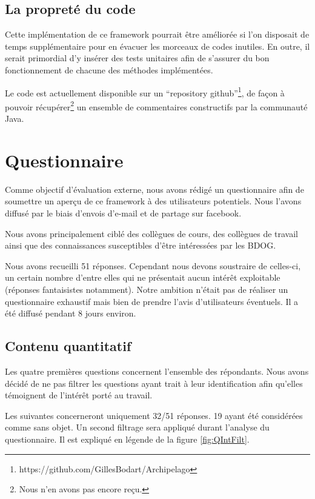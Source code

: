 \documentclass[a4paper,fleqn,12pt,oneside]{report}
\begin{document}
\subsection{La propreté du code}

Cette implémentation de ce framework pourrait être améliorée si l'on disposait de temps supplémentaire pour en évacuer les morceaux de codes inutiles. En outre, il serait primordial d'y insérer des tests unitaires afin de s'assurer du bon fonctionnement de chacune des méthodes implémentées.

Le code est actuellement disponible sur un \enquote{repository github}\footnote{https://github.com/GillesBodart/Archipelago}, de façon à pouvoir récupérer\footnote{Nous n'en avons pas encore reçu.} un ensemble de commentaires constructifs par la communauté Java. 

\section{Questionnaire}

Comme objectif d'évaluation externe, nous avons rédigé un questionnaire afin de soumettre un aperçu de ce framework à des utilisateurs potentiels. Nous l'avons diffusé par le biais d'envois d'e-mail et de partage sur facebook.

Nous avons principalement ciblé des collègues de cours, des collègues de travail ainsi que des connaissances susceptibles d'être intéressées par les BDOG.

Nous avons recueilli 51 réponses. Cependant nous devons soustraire de celles-ci, un certain nombre d'entre elles qui ne présentait aucun intérêt exploitable (réponses fantaisistes notamment). Notre ambition n'était pas de réaliser un questionnaire exhaustif mais bien de prendre l'avis d'utilisateurs éventuels. Il a été diffusé pendant 8 jours environ.


\subsection{Contenu quantitatif}

Les quatre premières questions concernent l'ensemble des répondants. Nous avons décidé de ne pas filtrer les questions ayant trait à leur identification afin qu'elles témoignent de l'intérêt porté au travail.

Les suivantes concerneront uniquement 32/51 réponses. 19 ayant été considérées comme sans objet. Un second filtrage sera appliqué durant l'analyse du questionnaire. Il est expliqué en légende de la figure \ref{fig:QIntFilt}.
\newpage
{}
\end{document}
